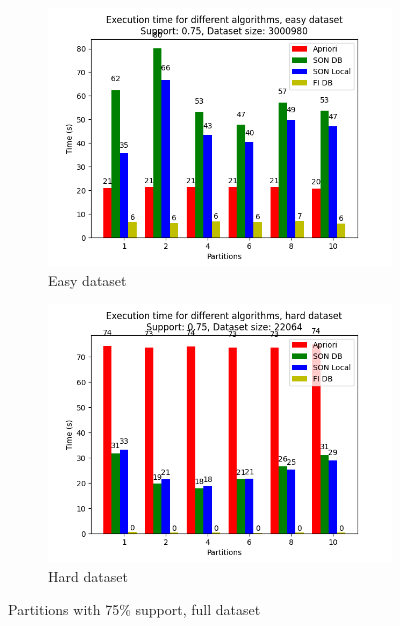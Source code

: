 \documentclass[a4paper]{article}
\begin{document}
	
	
	
	\begin{figure}[h]
		\centering
		\begin{subfigure}[b]{\textwidth}
			\centering
			\includegraphics[width=\textwidth]{1_easy_0,75_1_partitions.png}
         	\caption{Easy dataset}
		\end{subfigure}
		\hfill		
		\begin{subfigure}[b]{\textwidth}
			\centering
			\includegraphics[width=\textwidth]{1_hard_0,75_1_partitions.png}
         	\caption{Hard dataset}
		\end{subfigure}
		\hfill
		
		\caption{Partitions with 75\% support, full dataset}
		\label{fig:075sup}
	\end{figure}
	
\end{document}
